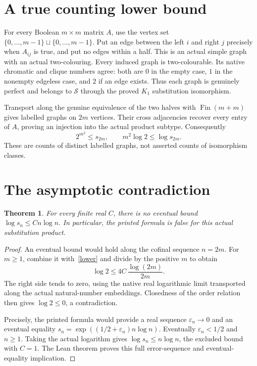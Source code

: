 \documentclass[11pt,a4paper]{article}
\newtheorem{theorem}{Theorem}
\begin{document}
\section*{A true counting lower bound}
For every Boolean $m\times m$ matrix $A$, use the vertex set
$\{0,\ldots,m-1\}\sqcup\{0,\ldots,m-1\}$. Put an edge between the left $i$
and right $j$ precisely when $A_{ij}$ is true, and put no edges within a half.
This is an actual simple graph with an actual two-colouring. Every induced graph
is two-colourable. Its native chromatic and clique numbers agree: both are $0$
in the empty case, $1$ in the nonempty edgeless case, and $2$ if an edge exists.
Thus each graph is genuinely perfect and belongs to $\mathcal S$ through the
proved $K_1$ substitution isomorphism.

Transport along the genuine equivalence of the two halves with $\operatorname{Fin}(m+m)$
gives labelled graphs on $2m$ vertices. Their cross adjacencies recover every
entry of $A$, proving an injection into the actual product subtype. Consequently
\begin{equation}\label{lower}
 2^{m^2}\le s_{2m},\qquad
 m^2\log 2\le\log s_{2m}.
\end{equation}
These are counts of distinct labelled graphs, not asserted counts of isomorphism classes.

\section*{The asymptotic contradiction}
\begin{theorem}
For every finite real $C$, there is no eventual bound
$\log s_n\le Cn\log n$. In particular, the printed formula is false for
this actual substitution product.
\end{theorem}
\begin{proof}
An eventual bound would hold along the cofinal sequence $n=2m$.
For $m\ge1$, combine it with~\eqref{lower} and divide by the positive $m$ to obtain
\[
 \log 2\le 4C\,\frac{\log(2m)}{2m}.
\]
The right side tends to zero, using the native real logarithmic limit transported
along the actual natural-number embeddings. Closedness of the order relation
then gives $\log2\le0$, a contradiction.

Precisely, the printed formula would provide a real sequence $\varepsilon_n\to0$
and an eventual equality
$s_n=\exp((1/2+\varepsilon_n)n\log n)$.
Eventually $\varepsilon_n<1/2$ and $n\ge1$. Taking the actual logarithm gives
$\log s_n\le n\log n$, the excluded bound with $C=1$.
The Lean theorem proves this full error-sequence and eventual-equality implication.
\end{proof}
\end{document}
